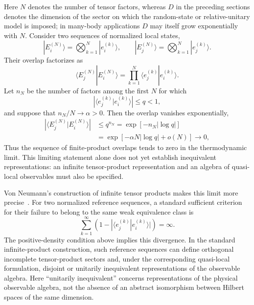 \documentclass[aps,pra,reprint,superscriptaddress,nofootinbib,longbibliography]{revtex4-2}
\newcommand{\ket}[1]{| #1 \rangle}
\newcommand{\braket}[2]{\langle #1 | #2 \rangle}
\begin{document}
Here $N$ denotes the number of tensor factors, whereas $D$ in the preceding
sections denotes the dimension of the sector on which the random-state or
relative-unitary model is imposed; in many-body applications $D$ may itself
grow exponentially with $N$.  Consider two sequences of normalized local
states,
\begin{equation}
    \ket{E_i^{(N)}}=
    \bigotimes_{k=1}^{N}\ket{e_i^{(k)}},
    \qquad
    \ket{E_j^{(N)}}=
    \bigotimes_{k=1}^{N}\ket{e_j^{(k)}} .
\end{equation}
Their overlap factorizes as
\begin{equation}
    \braket{E_j^{(N)}}{E_i^{(N)}}
    =
    \prod_{k=1}^{N}
    \braket{e_j^{(k)}}{e_i^{(k)}} .
    \label{eq:finite-product-overlap}
\end{equation}
Let $n_N$ be the number of factors among the first $N$ for which
\begin{equation}
    \left|
    \braket{e_j^{(k)}}{e_i^{(k)}}
    \right|
    \leq q<1 ,
\end{equation}
and suppose that $n_N/N\to\alpha>0$.  Then the overlap vanishes exponentially,
\begin{align}
 \left|\braket{E_j^{(N)}}{E_i^{(N)}}\right|
 &\leq q^{n_N}=\exp[-n_N|\log q|]
 \nonumber\\
 &=\exp[-\alpha N|\log q|+o(N)]
 \longrightarrow0,
    \label{eq:thermodynamic-orthogonality}
\end{align}
Thus the sequence of finite-product overlaps tends to zero in the
thermodynamic limit.  This limiting statement alone does not yet establish
inequivalent representations: an infinite tensor-product representation and
an algebra of quasi-local observables must also be specified.

Von Neumann's construction of infinite tensor products makes this limit more
precise~\cite{vonNeumann1939}.  For two normalized reference sequences, a
standard sufficient criterion for their failure to belong to the same weak
equivalence class is
\begin{equation}
 \sum_{k=1}^{\infty}
 \left(1-|\langle e_j^{(k)}|e_i^{(k)}\rangle|\right)=\infty.
 \label{eq:sector-criterion}
\end{equation}
The positive-density condition above implies this divergence.  In the
standard infinite-product construction, such reference sequences can define
orthogonal incomplete tensor-product sectors and, under the corresponding
quasi-local formulation, disjoint or unitarily inequivalent representations
of the observable algebra.  Here ``unitarily inequivalent'' concerns
representations of the physical observable algebra, not the absence of an
abstract isomorphism between Hilbert spaces of the same dimension.
\end{document}
